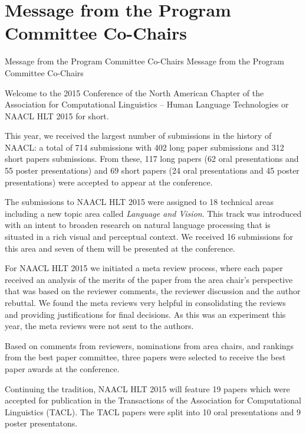 \section{Message from the Program Committee Co-Chairs}
\setheaders%
    {Message from the Program Committee Co-Chairs}%
    {Message from the Program Committee Co-Chairs}
\thispagestyle{emptyheader}

\setlength{\parskip}{.7ex}

Welcome to the 2015 Conference of the North American Chapter of the
Association for Computational Linguistics -- Human Language
Technologies or NAACL HLT 2015 for short. 

This year, we received the largest number of submissions in the
history of NAACL: a total of 714 submissions with 402 long paper
submissions and 312 short papers submissions. From these, 117 long
papers (62 oral presentations and 55 poster presentations) and 69
short papers (24 oral presentations and 45 poster presentations)
were accepted to appear at the conference.

The submissions to NAACL HLT 2015 were assigned to 18 technical
areas including a new topic area called {\em Language and Vision}.
This track was introduced with an intent to broaden research on
natural language processing that is situated in a rich visual and
perceptual context. We received 16 submissions for this area and
seven of them will be presented at the conference.

For NAACL HLT 2015 we initiated a meta review process, where each
paper received an analysis of the merits of the paper from the area
chair's perspective that was based on the reviewer comments, the
reviewer discussion and the author rebuttal.  We found the meta
reviews very helpful in consolidating the reviews and providing
justifications for final decisions. As this was an experiment this
year, the meta reviews were not sent to the authors.

Based on comments from reviewers, nominations from area chairs, and
rankings from the best paper committee, three papers were selected
to receive the best paper awards at the conference.

Continuing the tradition, NAACL HLT 2015 will feature 19 papers
which were accepted for publication in the Transactions of the
Association for Computational Linguistics (TACL). The TACL papers
were split into 10 oral presentations and 9 poster presentatons.


